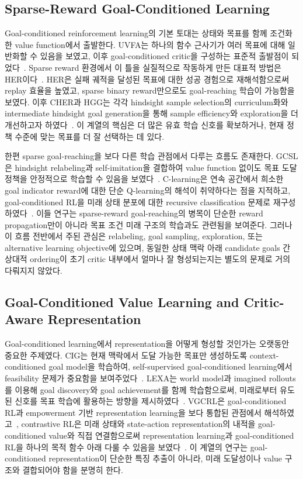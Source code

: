 \documentclass[journal]{IEEEtran}
\begin{document}
\subsection{Sparse-Reward Goal-Conditioned Learning}
Goal-conditioned reinforcement learning의 기본 토대는 상태와 목표를 함께 조건화한 value function에서 출발한다. UVFA는 하나의 함수 근사기가 여러 목표에 대해 일반화할 수 있음을 보였고, 이후 goal-conditioned critic을 구성하는 표준적 출발점이 되었다~\cite{schaul2015uvfa}. Sparse reward 환경에서 이 틀을 실질적으로 작동하게 만든 대표적 방법은 HER이다~\cite{andrychowicz2017her}. HER은 실패 궤적을 달성된 목표에 대한 성공 경험으로 재해석함으로써 replay 효율을 높였고, sparse binary reward만으로도 goal-reaching 학습이 가능함을 보였다. 이후 CHER과 HGG는 각각 hindsight sample selection의 curriculum화와 intermediate hindsight goal generation을 통해 sample efficiency와 exploration을 더 개선하고자 하였다~\cite{fang2019cher,ren2019hgg}. 이 계열의 핵심은 더 많은 유효 학습 신호를 확보하거나, 현재 정책 수준에 맞는 목표를 더 잘 선택하는 데 있다.

한편 sparse goal-reaching을 보다 다른 학습 관점에서 다루는 흐름도 존재한다. GCSL은 hindsight relabeling과 self-imitation을 결합하여 value function 없이도 목표 도달 정책을 안정적으로 학습할 수 있음을 보였다~\cite{ghosh2021gcsl}. C-learning은 연속 공간에서 희소한 goal indicator reward에 대한 단순 Q-learning의 해석이 취약하다는 점을 지적하고, goal-conditioned RL을 미래 상태 분포에 대한 recursive classification 문제로 재구성하였다~\cite{eysenbach2021clearning}. 이들 연구는 sparse-reward goal-reaching의 병목이 단순한 reward propagation만이 아니라 목표 조건 미래 구조의 학습과도 관련됨을 보여준다. 그러나 이 흐름 전반에서 주된 관심은 relabeling, goal sampling, exploration, 또는 alternative learning objective에 있으며, 동일한 상태 맥락 아래 candidate goals 간 상대적 ordering이 초기 critic 내부에서 얼마나 잘 형성되는지는 별도의 문제로 거의 다뤄지지 않았다.

\subsection{Goal-Conditioned Value Learning and Critic-Aware Representation}
Goal-conditioned learning에서 representation을 어떻게 형성할 것인가는 오랫동안 중요한 주제였다. CIG는 현재 맥락에서 도달 가능한 목표만 생성하도록 context-conditioned goal model을 학습하여, self-supervised goal-conditioned learning에서 feasibility 문제가 중요함을 보여주었다~\cite{nair2020cig}. LEXA는 world model과 imagined rollouts를 이용해 goal discovery와 goal achievement를 함께 학습함으로써, 미래로부터 유도된 신호를 목표 학습에 활용하는 방향을 제시하였다~\cite{mendonca2021lexa}. VGCRL은 goal-conditioned RL과 empowerment 기반 representation learning을 보다 통합된 관점에서 해석하였고~\cite{choi2021vgcrl}, contrastive RL은 미래 상태와 state-action representation의 내적을 goal-conditioned value와 직접 연결함으로써 representation learning과 goal-conditioned RL을 하나의 목적 함수 아래 다룰 수 있음을 보였다~\cite{eysenbach2022contrastive_gcrl}. 이 계열의 연구는 goal-conditioned representation이 단순한 특징 추출이 아니라, 미래 도달성이나 value 구조와 결합되어야 함을 분명히 한다.
\end{document}
